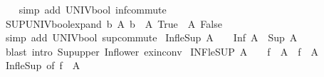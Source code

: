 \begin{isabellebody}
%
\isadelimproof
\ \ %
\endisadelimproof
%
\isatagproof
{}\isamarkupfalse%
\ {\isacharparenleft}{\kern0pt}simp\ add{\isacharcolon}{\kern0pt}\ UNIV{\isacharunderscore}{\kern0pt}bool\ inf{\isacharunderscore}{\kern0pt}commute{\isacharparenright}{\kern0pt}%
\endisatagproof
{\isafoldproof}%
%
\isadelimproof
\isanewline
%
\endisadelimproof
\isanewline
{}\isamarkupfalse%
\ SUP{\isacharunderscore}{\kern0pt}UNIV{\isacharunderscore}{\kern0pt}bool{\isacharunderscore}{\kern0pt}expand{\isacharcolon}{\kern0pt}\ {\isachardoublequoteopen}{\isacharparenleft}{\kern0pt}{\isasymSqunion}b{\isachardot}{\kern0pt}\ A\ b{\isacharparenright}{\kern0pt}\ {\isacharequal}{\kern0pt}\ A\ True\ {\isasymsqunion}\ A\ False{\isachardoublequoteclose}\isanewline
%
\isadelimproof
\ \ %
\endisadelimproof
%
\isatagproof
{}\isamarkupfalse%
\ {\isacharparenleft}{\kern0pt}simp\ add{\isacharcolon}{\kern0pt}\ UNIV{\isacharunderscore}{\kern0pt}bool\ sup{\isacharunderscore}{\kern0pt}commute{\isacharparenright}{\kern0pt}%
\endisatagproof
{\isafoldproof}%
%
\isadelimproof
\isanewline
%
\endisadelimproof
\isanewline
{}\isamarkupfalse%
\ Inf{\isacharunderscore}{\kern0pt}le{\isacharunderscore}{\kern0pt}Sup{\isacharcolon}{\kern0pt}\ {\isachardoublequoteopen}A\ {\isasymnoteq}\ {\isacharbraceleft}{\kern0pt}{\isacharbraceright}{\kern0pt}\ {\isasymLongrightarrow}\ Inf\ A\ {\isasymle}\ Sup\ A{\isachardoublequoteclose}\isanewline
%
\isadelimproof
\ \ %
\endisadelimproof
%
\isatagproof
{}\isamarkupfalse%
\ {\isacharparenleft}{\kern0pt}blast\ intro{\isacharcolon}{\kern0pt}\ Sup{\isacharunderscore}{\kern0pt}upper{}\ Inf{\isacharunderscore}{\kern0pt}lower\ ex{\isacharunderscore}{\kern0pt}in{\isacharunderscore}{\kern0pt}conv{\isacharparenright}{\kern0pt}%
\endisatagproof
{\isafoldproof}%
%
\isadelimproof
\isanewline
%
\endisadelimproof
\isanewline
{}\isamarkupfalse%
\ INF{\isacharunderscore}{\kern0pt}le{\isacharunderscore}{\kern0pt}SUP{\isacharcolon}{\kern0pt}\ {\isachardoublequoteopen}A\ {\isasymnoteq}\ {\isacharbraceleft}{\kern0pt}{\isacharbraceright}{\kern0pt}\ {\isasymLongrightarrow}\ {\isasymSqinter}{\isacharparenleft}{\kern0pt}f\ {\isacharbackquote}{\kern0pt}\ A{\isacharparenright}{\kern0pt}\ {\isasymle}\ {\isasymSqunion}{\isacharparenleft}{\kern0pt}f\ {\isacharbackquote}{\kern0pt}\ A{\isacharparenright}{\kern0pt}{\isachardoublequoteclose}\isanewline
%
\isadelimproof
\ \ %
\endisadelimproof
%
\isatagproof
{}\isamarkupfalse%
\ Inf{\isacharunderscore}{\kern0pt}le{\isacharunderscore}{\kern0pt}Sup\ {\isacharbrackleft}{\kern0pt}of\ {\isachardoublequoteopen}f\ {\isacharbackquote}{\kern0pt}\ A{\isachardoublequoteclose}{\isacharbrackright}{\kern0pt}\ \isamarkupfalse%

\end{isabellebody}
